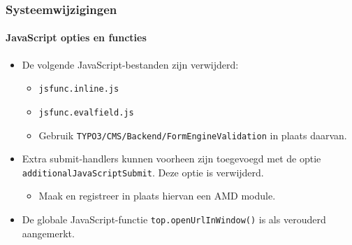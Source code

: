 \begin{frame}[fragile]
	\frametitle{Systeemwijzigingen}
	\framesubtitle{JavaScript opties en functies}

	\begin{itemize}
		\item De volgende JavaScript-bestanden zijn verwijderd:

			\begin{itemize}
				\item \texttt{jsfunc.inline.js}
				\item \texttt{jsfunc.evalfield.js}
			\end{itemize}

			\begin{itemize}\smaller
				\item[\ding{228}] Gebruik \texttt{TYPO3/CMS/Backend/FormEngineValidation} in plaats daarvan.
			\end{itemize}\normalsize

		\item Extra submit-handlers kunnen voorheen zijn toegevoegd met de optie \texttt{additionalJavaScriptSubmit}.
			Deze optie is verwijderd.

			\begin{itemize}\smaller
				\item[\ding{228}] Maak en registreer in plaats hiervan een AMD module.
			\end{itemize}\normalsize

		\item De globale JavaScript-functie \texttt{top.openUrlInWindow()} is als verouderd aangemerkt.

	\end{itemize}

\end{frame}


